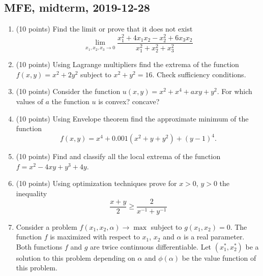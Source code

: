 \subsection{MFE, midterm, 2019-12-28}

\begin{enumerate}
  \item (10 points) Find the limit or prove that it does not exist
  \[
  \lim_{x_1, x_2, x_3 \to 0} \frac{x_1^2 + 4x_1 x_2 - x_2^2 + 6 x_3x_2}{x_1^2 + x_2^2 +x_3^2}
  \]

  \item (10 points) Using Lagrange multipliers find the extrema of the function $f(x,y) = x^2 + 2 y^2$ subject to $x^2 + y^2 = 16$.
Check sufficiency conditions.

 \item (10 points) Consider the function $u(x,y) = x^2 + x^4 + axy + y^2$. 
 For which values of $a$ the function $u$ is convex? concave?

 \item (10 points) Using Envelope theorem find the approximate minimum of the function
 \[
 f(x, y) = x^4 + 0.001 (x^2 + y + y^2) + (y-1)^4.
 \]

  \item (10 points) Find and classify all the local extrema of the function $f = x^2 - 4xy +y^3 +4y$.


\item (10 points) Using optimization techniques prove for $x> 0$, $y>0$ the inequality 
\[
\frac{x + y}{2} \geq \frac{2}{x^{-1} + y^{-1}}  
\]

  



\item Consider a problem $f(x_1, x_2, \alpha) \to \max$ subject to $g(x_1, x_2) = 0$. 
The function $f$ is maximized with respect to $x_1$, $x_2$ and $\alpha$ is a real parameter. 
Both functions $f$ and $g$ are twice continuous differentiable. 
Let $(x_1^*, x_2^*)$ be a solution to this problem depending on $\alpha$ 
and $\phi(\alpha)$ be the value function of this problem. 


\end{enumerate}

